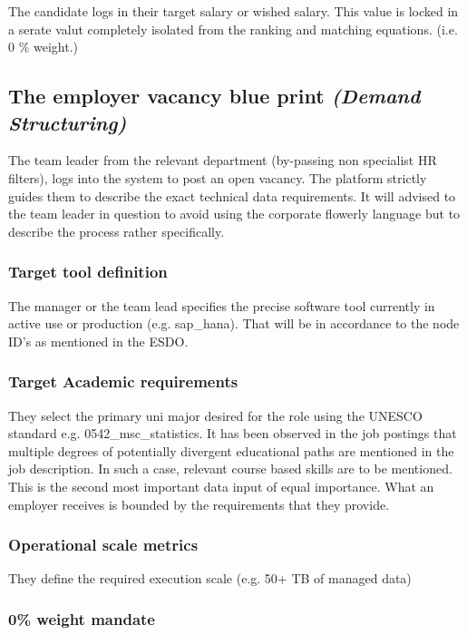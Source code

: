 \documentclass[a4paper, 12pt]{article}
\begin{document}
The candidate logs in their target salary or wished salary. This value is locked in a serate valut completely isolated from the ranking and matching equations. (i.e. 0 \% weight.)

\subsection{The employer vacancy blue print \textit{(Demand Structuring)}}

The team leader from the relevant department (by-passing non specialist HR filters), logs into the system to post an open vacancy. The platform strictly guides them to describe the exact technical data requirements. It will advised to the team leader in question to avoid using the corporate flowerly language but to describe the process rather specifically.

\subsubsection{Target tool definition}

The manager or the team lead specifies the precise software tool currently in active use or production (e.g. sap\_hana). That will be in accordance to the node ID's as mentioned in the ESDO.

\subsubsection{Target Academic requirements}

They select the primary uni major desired for the role using the UNESCO standard e.g. 0542\_msc\_statistics. It has been observed in the job postings that multiple degrees of potentially divergent educational paths are mentioned in the job description. In such a case, relevant course based skills are to be mentioned. This is the second most important data input of equal importance. What an employer receives is bounded by the requirements that they provide.

\subsubsection{Operational scale metrics}

They define the required execution scale (e.g. 50+ TB of managed data)

\subsubsection{0\% weight mandate}
\end{document}
